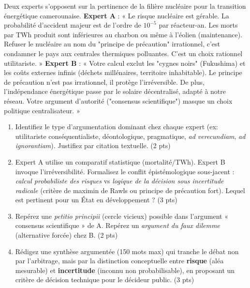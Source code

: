 \documentclass[11pt]{article}
\begin{document}
\begin{exercice}
Deux experts s'opposent sur la pertinence de la filière nucléaire pour la transition énergétique camerounaise.
\textbf{Expert A} : « Le risque nucléaire est gérable. La probabilité d'accident majeur est de l'ordre de $10^{-5}$ par réacteur-an. Les morts par TWh produit sont inférieures au charbon ou même à l'éolien (maintenance). Refuser le nucléaire au nom du "principe de précaution" irrationnel, c'est condamner le pays aux centrales thermiques polluantes. C'est un choix rationnel utilitariste. »
\textbf{Expert B} : « Votre calcul exclut les "cygnes noirs" (Fukushima) et les coûts externes infinis (déchets millénaires, territoire inhabitable). Le principe de précaution n'est pas irrationnel, il protège l'irréversible. De plus, l'indépendance énergétique passe par le solaire décentralisé, adapté à notre réseau. Votre argument d'autorité ("consensus scientifique") masque un choix politique centralisateur. »
\begin{enumerate}
    \item Identifiez le type d'argumentation dominant chez chaque expert (ex: utilitariste conséquentialiste, déontologique, pragmatique, \textit{ad verecundiam}, \textit{ad ignorantiam}). Justifiez par citation textuelle. \hfill (2 pts)
    \item Expert A utilise un comparatif statistique (mortalité/TWh). Expert B invoque l'irréversibilité. Formalisez le conflit épistémologique sous-jacent : \textit{calcul probabiliste des risques} vs \textit{logique de la décision sous incertitude radicale} (critère de maximin de Rawls ou principe de précaution fort). Lequel est pertinent pour un État en développement ? \hfill (3 pts)
    \item Repérez une \textit{petitio principii} (cercle vicieux) possible dans l'argument « consensus scientifique » de A. Repérez un \textit{argument du faux dilemme} (alternative forcée) chez B. \hfill (2 pts)
    \item Rédigez une synthèse argumentée (150 mots max) qui tranche le débat non par l'arbitrage, mais par la distinction conceptuelle entre \textbf{risque} (aléa mesurable) et \textbf{incertitude} (inconnu non probabilisable), en proposant un critère de décision technique pour le décideur public. \hfill (3 pts)
\end{enumerate}
\end{exercice}
\end{document}
